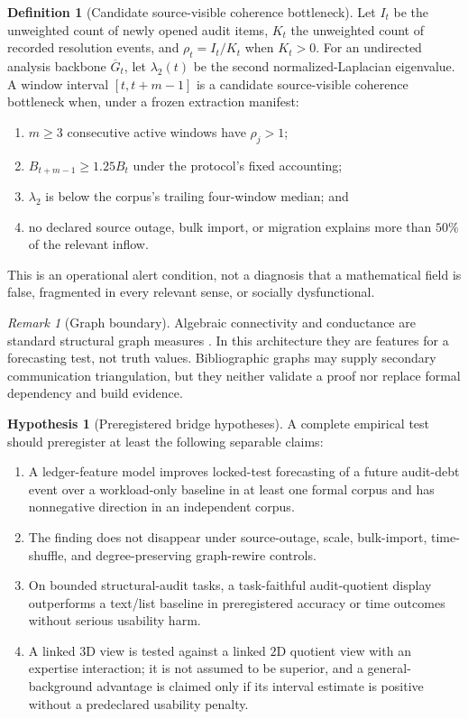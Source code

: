 \documentclass[11pt]{article}
\newcommand{\Debt}{\ensuremath{B}}
\theoremstyle{plain}
\theoremstyle{definition}
\newtheorem{definition}[theorem]{Definition}
\newtheorem{hypothesis}[theorem]{Hypothesis}
\theoremstyle{remark}
\newtheorem{remark}[theorem]{Remark}
\begin{document}
\begin{definition}[Candidate source-visible coherence bottleneck]
\label{def:bottleneck}
Let $I_t$ be the unweighted count of newly opened audit items, $K_t$ the
unweighted count of recorded resolution events, and
$\rho_t=I_t/K_t$ when $K_t>0$.  For an undirected analysis backbone
$\overline G_t$, let $\lambda_2(t)$ be the second normalized-Laplacian
eigenvalue.  A window interval $[t,t+m-1]$ is a candidate source-visible
coherence bottleneck when, under a frozen extraction manifest:
\begin{enumerate}[label=(\roman*),leftmargin=.75cm]
  \item $m\geq3$ consecutive active windows have $\rho_j>1$;
  \item $\Debt_{t+m-1}\geq1.25\Debt_t$ under the protocol's fixed accounting;
  \item $\lambda_2$ is below the corpus's trailing four-window median; and
  \item no declared source outage, bulk import, or migration explains more than
  $50\%$ of the relevant inflow.
\end{enumerate}
This is an operational alert condition, not a diagnosis that a mathematical
field is false, fragmented in every relevant sense, or socially dysfunctional.
\end{definition}

\begin{remark}[Graph boundary]
\label{rem:graph-boundary}
Algebraic connectivity and conductance are standard structural graph measures
\cite{fiedler1973,chung1997}.  In this architecture they are features for a
forecasting test, not truth values.  Bibliographic graphs may supply secondary
communication triangulation, but they neither validate a proof nor replace
formal dependency and build evidence.
\end{remark}

\begin{hypothesis}[Preregistered bridge hypotheses]
\label{hyp:bridge}
A complete empirical test should preregister at least the following separable
claims:
\begin{enumerate}[label=\textnormal{(E\arabic*)},leftmargin=2.4em]
\item A ledger-feature model improves locked-test forecasting of a future
audit-debt event over a workload-only baseline in at least one formal corpus and
has nonnegative direction in an independent corpus.
\item The finding does not disappear under source-outage, scale, bulk-import,
time-shuffle, and degree-preserving graph-rewire controls.
\item On bounded structural-audit tasks, a task-faithful audit-quotient display
outperforms a text/list baseline in preregistered accuracy or time outcomes
without serious usability harm.
\item A linked $3$D view is tested against a linked $2$D quotient view with an
expertise interaction; it is not assumed to be superior, and a general-background
advantage is claimed only if its interval estimate is positive without a
predeclared usability penalty.
\end{enumerate}
\end{hypothesis}
\end{document}
